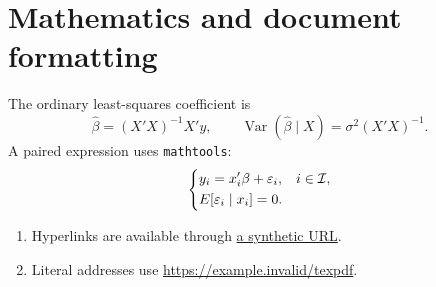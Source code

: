 \documentclass{article}
\begin{document}
\section{Mathematics and document formatting}
The ordinary least-squares coefficient is
\[
  \widehat\beta = \left(X'X\right)^{-1}X'y,
  \qquad
  \operatorname{Var}(\widehat\beta\mid X)
  = \sigma^2\left(X'X\right)^{-1}.
\]
A paired expression uses \texttt{mathtools}:
\[
  \begin{dcases}
    y_i = x_i'\beta + \varepsilon_i, & i \in \mathcal{I},\\
    E[\varepsilon_i\mid x_i]=0. &
  \end{dcases}
\]

\begin{enumerate}[label=\textcolor{blue!60!black}{\arabic*.},leftmargin=*]
  \item Hyperlinks are available through \href{https://example.invalid}{a synthetic URL}.
  \item Literal addresses use \url{https://example.invalid/texpdf}.
\end{enumerate}
\end{document}

